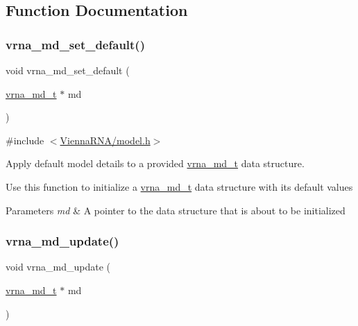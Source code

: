 \subsection{Function Documentation}
\mbox{\label{group__model__details_ga8ac6ff84936282436f822644bf841f66}} 
\subsubsection{\texorpdfstring{vrna\_md\_set\_default()}{vrna\_md\_set\_default()}}
{\footnotesize\ttfamily void vrna\+\_\+md\+\_\+set\+\_\+default (\begin{DoxyParamCaption}\item[{\mbox{\hyperlink{group__model__details_ga1f8a10e12a0a1915f2a4eff0b28ea17c}{vrna\+\_\+md\+\_\+t}} $\ast$}]{md }\end{DoxyParamCaption})}



{\ttfamily \#include $<$\mbox{\hyperlink{model_8h}{Vienna\+R\+N\+A/model.\+h}}$>$}



Apply default model details to a provided \mbox{\hyperlink{group__model__details_ga1f8a10e12a0a1915f2a4eff0b28ea17c}{vrna\+\_\+md\+\_\+t}} data structure. 

Use this function to initialize a \mbox{\hyperlink{group__model__details_ga1f8a10e12a0a1915f2a4eff0b28ea17c}{vrna\+\_\+md\+\_\+t}} data structure with its default values


\begin{DoxyParams}{Parameters}
{\em md} & A pointer to the data structure that is about to be initialized \\
\hline
\end{DoxyParams}
\mbox{\label{group__model__details_ga36ae40b8c3b82362f5798ad5b047b814}} 
\subsubsection{\texorpdfstring{vrna\_md\_update()}{vrna\_md\_update()}}
{\footnotesize\ttfamily void vrna\+\_\+md\+\_\+update (\begin{DoxyParamCaption}\item[{\mbox{\hyperlink{group__model__details_ga1f8a10e12a0a1915f2a4eff0b28ea17c}{vrna\+\_\+md\+\_\+t}} $\ast$}]{md }\end{DoxyParamCaption})}



